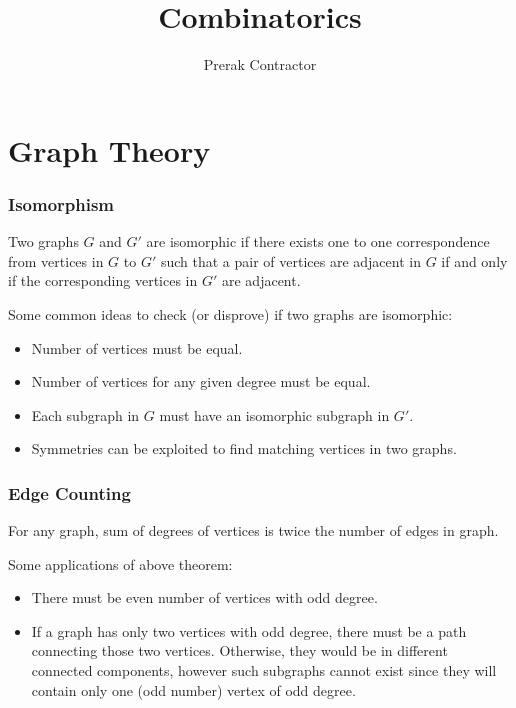 \documentclass[10pt]{article}
\title{Combinatorics}
\author{Prerak Contractor}
\begin{document}
\maketitle
\pagestyle{fancynotes}
\part{Graph Theory}

\section{Isomorphism}

\begin{definition}
    Two graphs $G$ and $G'$ are isomorphic if there exists one to one correspondence from vertices in $G$ to $G'$ such that a pair of vertices are adjacent in $G$ if and only if the corresponding vertices in $G'$ are adjacent.
\end{definition}

Some common ideas to check (or disprove) if two graphs are isomorphic:

\begin{itemize}
    \item Number of vertices must be equal.
    \item Number of vertices for any given degree must be equal.
    \item Each subgraph in $G$ must have an isomorphic subgraph in $G'$.
    \item Symmetries can be exploited to find matching vertices in two graphs.
\end{itemize}


\section{Edge Counting}

\begin{theorem}
    For any graph, sum of degrees of vertices is twice the number of edges in graph.
\end{theorem}

Some applications of above theorem:

\begin{itemize}
    \item There must be even number of vertices with odd degree.
    \item If a graph has only two vertices with odd degree, there must be a path connecting those two vertices. Otherwise, they would be in different connected components, however such subgraphs cannot exist since they will contain only one (odd number) vertex of odd degree. 
\end{itemize}
\end{document}
